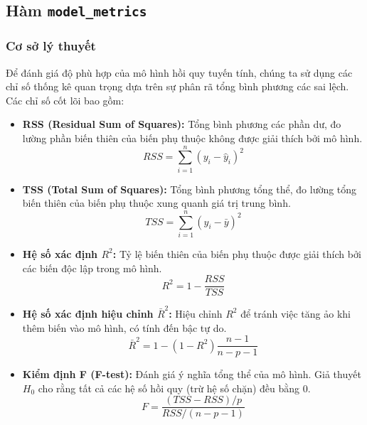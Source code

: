 \subsection{Hàm \texttt{model\_metrics}}

\subsubsection{Cơ sở lý thuyết}
Để đánh giá độ phù hợp của mô hình hồi quy tuyến tính, chúng ta sử dụng các chỉ số thống kê quan trọng dựa trên sự phân rã tổng bình phương các sai lệch. Các chỉ số cốt lõi bao gồm:

\begin{itemize}
    \item \textbf{RSS (Residual Sum of Squares):} Tổng bình phương các phần dư, đo lường phần biến thiên của biến phụ thuộc không được giải thích bởi mô hình.
    \begin{equation}
        RSS = \sum_{i=1}^{n} (y_i - \hat{y}_i)^2
    \end{equation}
    
    \item \textbf{TSS (Total Sum of Squares):} Tổng bình phương tổng thể, đo lường tổng biến thiên của biến phụ thuộc xung quanh giá trị trung bình.
    \begin{equation}
        TSS = \sum_{i=1}^{n} (y_i - \bar{y})^2
    \end{equation}
    
    \item \textbf{Hệ số xác định $R^2$:} Tỷ lệ biến thiên của biến phụ thuộc được giải thích bởi các biến độc lập trong mô hình.
    \begin{equation}
        R^2 = 1 - \frac{RSS}{TSS}
    \end{equation}
    
    \item \textbf{Hệ số xác định hiệu chỉnh $\bar{R}^2$:} Hiệu chỉnh $R^2$ để tránh việc tăng ảo khi thêm biến vào mô hình, có tính đến bậc tự do.
    \begin{equation}
        \bar{R}^2 = 1 - (1 - R^2) \frac{n-1}{n-p-1}
    \end{equation}
    
    \item \textbf{Kiểm định F (F-test):} Đánh giá ý nghĩa tổng thể của mô hình. Giả thuyết $H_0$ cho rằng tất cả các hệ số hồi quy (trừ hệ số chặn) đều bằng 0.
    \begin{equation}
        F = \frac{(TSS - RSS) / p}{RSS / (n - p - 1)}
    \end{equation}
\end{itemize}

